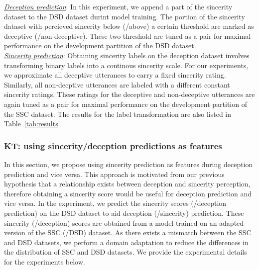 \documentclass{article}
\begin{document}
\noindent\underline{\it Deception prediction}: 
In this experiment, we append a part of the sincerity dataset to the DSD dataset durint model training.
The portion of the sincerity dataset with percieved sincerity below (/above) a certain threshold are marked as deceptive (/non-deceptive). 
These two threshold are tuned as a pair for maximal performance on the development partition of the DSD dataset. 
\\

\noindent\underline{\it Sincerity prediction}:
Obtaining sincerity labels on the deception dataset involves transforming binary labels into a continous sincerity scale.
For our experiments, we approximate all deceptive utterances to carry a fixed sincerity rating. 
Similarly, all non-decptive utterances are labeled with a different constant sincerity ratings.
These ratings for the deceptive and non-deceptive utterances are again tuned as a pair for maximal performance on the development partition of the SSC dataset.
The results for the label transformation are also listed in Table~\ref{tab:results}.

\subsubsection{KT: using sincerity/deception predictions as features}
In this section, we propose using sincerity prediction as features during deception prediction and vice versa.
This approach is motivated from our previous hypothesis that a relationship exists between deception and sincerity perception, therefore obtaining a sincerity score would be useful for deception prediction and vice versa.
In the experiment, we predict the sincerity scores (/deception prediction) on the DSD dataset to aid deception (/sincerity) prediction. 
These sincerity (/deception) scores are obtained from a model trained on an adapted version of the SSC (/DSD) dataset.
As there exists a mismatch between the SSC and DSD datasets, we perform a domain adaptation to reduce the differences in the distribution of SSC and DSD datasets.
We provide the experimental details for the experiments below.
\\
\end{document}
